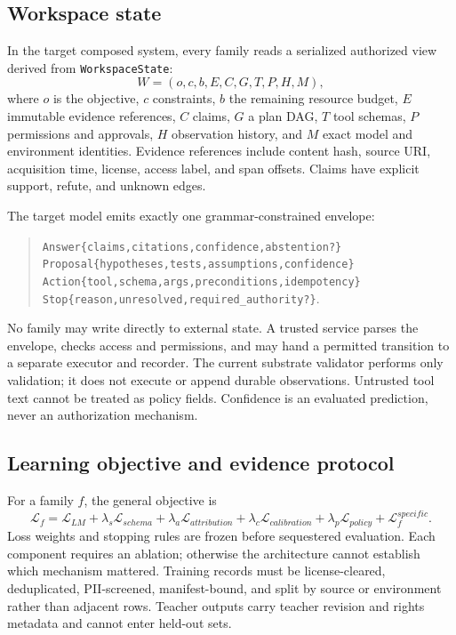 \documentclass[10pt]{article}
\begin{document}
\subsection{Workspace state}

In the target composed system, every family reads a serialized authorized view
derived from \texttt{WorkspaceState}:
\begin{equation}
W=(o,c,b,E,C,G,T,P,H,M),
\end{equation}
where $o$ is the objective, $c$ constraints, $b$ the remaining resource budget,
$E$ immutable evidence references, $C$ claims, $G$ a plan DAG, $T$ tool schemas,
$P$ permissions and approvals, $H$ observation history, and $M$ exact model and
environment identities. Evidence references include content hash, source URI,
acquisition time, license, access label, and span offsets. Claims have explicit
support, refute, and unknown edges.

The target model emits exactly one grammar-constrained envelope:

\begin{quote}\small
\texttt{Answer\{claims,citations,confidence,abstention?\}}\\
\texttt{Proposal\{hypotheses,tests,assumptions,confidence\}}\\
\texttt{Action\{tool,schema,args,preconditions,idempotency\}}\\
\texttt{Stop\{reason,unresolved,required\_authority?\}}.
\end{quote}

No family may write directly to external state. A trusted service parses the
envelope, checks access and permissions, and may hand a permitted transition to
a separate executor and recorder. The current substrate validator performs only
validation; it does not execute or append durable observations. Untrusted tool
text cannot be treated as policy fields. Confidence is an evaluated prediction,
never an authorization mechanism.

\subsection{Learning objective and evidence protocol}

For a family $f$, the general objective is
\begin{equation}
\mathcal{L}_f=\mathcal{L}_{LM}+\lambda_s\mathcal{L}_{schema}
+\lambda_a\mathcal{L}_{attribution}+\lambda_c\mathcal{L}_{calibration}
+\lambda_p\mathcal{L}_{policy}+\mathcal{L}^{specific}_f.
\end{equation}
Loss weights and stopping rules are frozen before sequestered evaluation. Each
component requires an ablation; otherwise the architecture cannot establish
which mechanism mattered. Training records must be license-cleared,
deduplicated, PII-screened, manifest-bound, and split by source or environment
rather than adjacent rows. Teacher outputs carry teacher revision and rights
metadata and cannot enter held-out sets.
\end{document}
